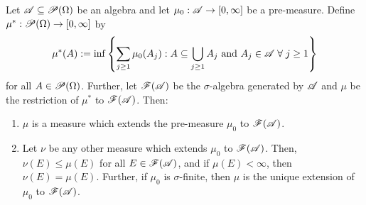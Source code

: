 \begin{theorem}
    Let $\mathscr{A} \subseteq \mathscr{P}(\Omega)$ be an algebra and let $\mu_0: \mathscr{A} \to [0, \infty]$ be a pre-measure. Define $\mu^*: \mathscr{P}(\Omega) \to [0, \infty]$ by
    \begin{equation*}
        \mu^*(A) := \inf\left\{ \sum_{j\geq 1} \mu_0(A_j) : A \subseteq \bigcup_{j \geq 1} A_j \text{ and } A_j \in \mathscr{A} \; \forall \; j \geq 1 \right\}
    \end{equation*}
    for all $A \in \mathscr{P}(\Omega)$. Further, let $\mathscr{F}(\mathscr{A})$ be the $\sigma$-algebra generated by $\mathscr{A}$ and $\mu$ be the restriction of $\mu^*$ to $\mathscr{F}(\mathscr{A})$. Then:
    \begin{enumerate}
        \item $\mu$ is a measure which extends the pre-measure $\mu_0$ to $\mathscr{F}(\mathscr{A})$.
        \item Let $\nu$ be any other measure which extends $\mu_0$ to $\mathscr{F}(\mathscr{A})$. Then, $\nu(E) \leq \mu(E)$ for all $E \in \mathscr{F}(\mathscr{A})$, and if $\mu(E) < \infty$, then $\nu(E) = \mu(E)$. Further, if $\mu_0$ is $\sigma$-finite, then $\mu$ is the unique extension of $\mu_0$ to $\mathscr{F}(\mathscr{A})$.
    \end{enumerate}
\end{theorem}

